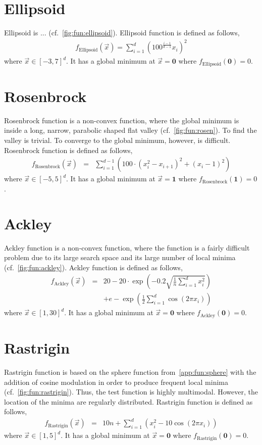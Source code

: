 \section{Ellipsoid}\label{app:fun:ellipsoid}
Ellipsoid is ... (cf.~\cref{fig:fun:ellipsoid}). Ellipsoid function is defined as follows,
\begin{eqnarray}f_{\textrm{Ellipsoid}}(\vec{x})=\sum_{i=1}^d \left(100^{\frac{i-1}{d-1}}x_i\right)^2
\end{eqnarray} where $\vec{x}\in[-3,7]^d$.
It has a global minimum at $\vec{x}=\textbf{0}$ where $f_{\textrm{Ellipsoid}}(\textbf{0})=0$.

\section{Rosenbrock}\label{app:fun:rosen}
Rosenbrock function is a non-convex function, where the global minimum is inside a long, narrow, parabolic shaped flat valley (cf.~\cref{fig:fun:rosen}). To find the valley is trivial. To converge to the global minimum, however, is difficult. Rosenbrock function is defined as follows,
\begin{eqnarray}
	f_{\textrm{Rosenbrock}}(\vec{x})&=&\sum_{i=1}^{d-1} \left(100\cdot(x_i^2-x_{i+1})^2+(x_i-1)^2\right)
\end{eqnarray} where $\vec{x}\in[-5,5]^d$. 
It has a global minimum at $\vec{x}=\textbf{1}$ where $f_{\textrm{Rosenbrock}}(\textbf{1})=0$.

\section{Ackley}\label{app:fun:ackley}
Ackley function is a non-convex function, where the function is a fairly difficult problem due to its large search space and its large number of local minima (cf.~\cref{fig:fun:ackley}). Ackley function is defined as follows,
\begin{eqnarray}
	f_{\textrm{Ackley}}(\vec{x})&=&20-20\cdot\exp\left(-0.2\sqrt{\frac{1}{n}\sum_{i=1}^d x_i^2}\right)
	\\&&+e-\exp\left(\frac{1}{2}\sum_{i=1}^d \cos(2\pi x_i)\right) \nonumber
\end{eqnarray} where $\vec{x}\in[1,30]^d$.
It has a global minimum at $\vec{x}=\textbf{0}$ where $f_{\textrm{Ackley}}(\textbf{0})=0$.

\section{Rastrigin}\label{app:fun:rastrigin}
Rastrigin function is based on the sphere function from~\cref{app:fun:sphere} with the addition of cosine modulation in order to produce frequent local minima (cf.~\cref{fig:fun:rastrigin}). Thus, the test function is highly multimodal. However, the location of the minima are regularly distributed. Rastrigin function is defined as follows,
\begin{eqnarray}
	f_{\textrm{Rastrigin}}(\vec{x})&=&10n+\sum_{i=1}^d \left(x_i^2-10\cos(2\pi x_i)\right)
\end{eqnarray} where $\vec{x}\in[1,5]^d$. 
It has a global minimum at $\vec{x}=\textbf{0}$ where $f_{\textrm{Rastrigin}}(\textbf{0})=0$.

